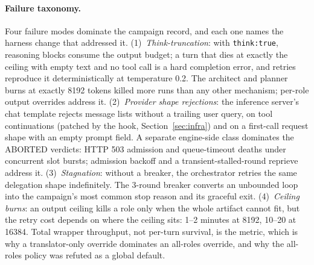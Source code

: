 \documentclass[11pt]{article}
\begin{document}
\paragraph{Failure taxonomy.}
Four failure modes dominate the campaign record, and each one names the
harness change that addressed it.
(1)~\emph{Think-truncation}: with \texttt{think:true}, reasoning blocks
consume the output budget; a turn that dies at exactly the ceiling with
empty text and no tool call is a hard completion error, and retries
reproduce it deterministically at temperature 0.2. The architect and
planner burns at exactly 8192 tokens killed more runs than any other
mechanism; per-role output overrides address it.
(2)~\emph{Provider shape rejections}: the inference server's chat
template rejects message lists without a trailing user query, on tool
continuations
(patched by the hook, Section~\ref{sec:infra}) and on a first-call
request shape with an empty prompt field. A separate engine-side class
dominates the ABORTED verdicts: HTTP 503 admission and queue-timeout
deaths under concurrent slot bursts; admission backoff and a
transient-stalled-round reprieve address it.
(3)~\emph{Stagnation}: without a breaker, the orchestrator retries the
same delegation shape indefinitely. The 3-round breaker converts an
unbounded loop into the campaign's most common stop reason and its
graceful exit.
(4)~\emph{Ceiling burns}: an output ceiling kills a role only when the
whole artifact cannot fit, but the retry cost depends on where the
ceiling sits: 1--2 minutes at 8192, 10--20 at 16384. Total wrapper
throughput, not per-turn survival, is the metric, which is why a
translator-only override dominates an all-roles override, and why the
all-roles policy was refuted as a global default.
\end{document}
